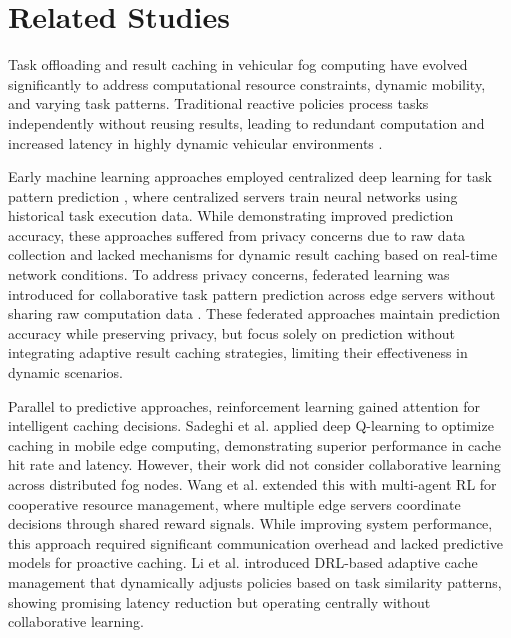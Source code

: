 \section{Related Studies}

\noindent Task offloading and result caching in vehicular fog computing have evolved significantly to address computational resource constraints, dynamic mobility, and varying task patterns. Traditional reactive policies process tasks independently without reusing results, leading to redundant computation and increased latency in highly dynamic vehicular environments \cite{zhang2018caching}.

Early machine learning approaches employed centralized deep learning for task pattern prediction \cite{chen2019deep}, where centralized servers train neural networks using historical task execution data. While demonstrating improved prediction accuracy, these approaches suffered from privacy concerns due to raw data collection and lacked mechanisms for dynamic result caching based on real-time network conditions. To address privacy concerns, federated learning was introduced for collaborative task pattern prediction across edge servers without sharing raw computation data \cite{liu2020federated,lim2020federated}. These federated approaches maintain prediction accuracy while preserving privacy, but focus solely on prediction without integrating adaptive result caching strategies, limiting their effectiveness in dynamic scenarios.

Parallel to predictive approaches, reinforcement learning gained attention for intelligent caching decisions. Sadeghi et al. \cite{sadeghi2019deep} applied deep Q-learning to optimize caching in mobile edge computing, demonstrating superior performance in cache hit rate and latency. However, their work did not consider collaborative learning across distributed fog nodes. Wang et al. \cite{wang2020reinforcement} extended this with multi-agent RL for cooperative resource management, where multiple edge servers coordinate decisions through shared reward signals. While improving system performance, this approach required significant communication overhead and lacked predictive models for proactive caching. Li et al. \cite{li2024adaptive} introduced DRL-based adaptive cache management that dynamically adjusts policies based on task similarity patterns, showing promising latency reduction but operating centrally without collaborative learning.

